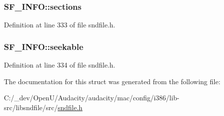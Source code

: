 \subsubsection[{\texorpdfstring{sections}{sections}}]{ S\+F\+\_\+\+I\+N\+F\+O\+::sections}\hypertarget{struct_s_f___i_n_f_o_a5f4c7cb564c05f6c3eeac9164a806544}{}\label{struct_s_f___i_n_f_o_a5f4c7cb564c05f6c3eeac9164a806544}


Definition at line 333 of file sndfile.\+h.

\subsubsection[{\texorpdfstring{seekable}{seekable}}]{ S\+F\+\_\+\+I\+N\+F\+O\+::seekable}\hypertarget{struct_s_f___i_n_f_o_ad8978123d4122e137e9500f65d28ac31}{}\label{struct_s_f___i_n_f_o_ad8978123d4122e137e9500f65d28ac31}


Definition at line 334 of file sndfile.\+h.



The documentation for this struct was generated from the following file\+:\begin{DoxyCompactItemize}
\item 
C\+:/\+\_\+dev/\+Open\+U/\+Audacity/audacity/mac/config/i386/lib-\/src/libsndfile/src/\hyperlink{mac_2config_2i386_2lib-src_2libsndfile_2src_2sndfile_8h}{sndfile.\+h}\end{DoxyCompactItemize}
